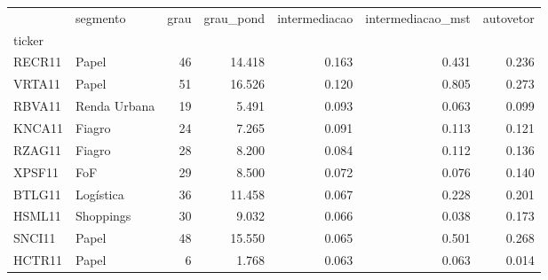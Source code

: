 \begin{tabular}{llrrrrr}
\toprule
 & segmento & grau & grau\_pond & intermediacao & intermediacao\_mst & autovetor \\
ticker &  &  &  &  &  &  \\
\midrule
RECR11 & Papel & 46 & 14.418 & 0.163 & 0.431 & 0.236 \\
VRTA11 & Papel & 51 & 16.526 & 0.120 & 0.805 & 0.273 \\
RBVA11 & Renda Urbana & 19 & 5.491 & 0.093 & 0.063 & 0.099 \\
KNCA11 & Fiagro & 24 & 7.265 & 0.091 & 0.113 & 0.121 \\
RZAG11 & Fiagro & 28 & 8.200 & 0.084 & 0.112 & 0.136 \\
XPSF11 & FoF & 29 & 8.500 & 0.072 & 0.076 & 0.140 \\
BTLG11 & Logística & 36 & 11.458 & 0.067 & 0.228 & 0.201 \\
HSML11 & Shoppings & 30 & 9.032 & 0.066 & 0.038 & 0.173 \\
SNCI11 & Papel & 48 & 15.550 & 0.065 & 0.501 & 0.268 \\
HCTR11 & Papel & 6 & 1.768 & 0.063 & 0.063 & 0.014 \\
\bottomrule
\end{tabular}
